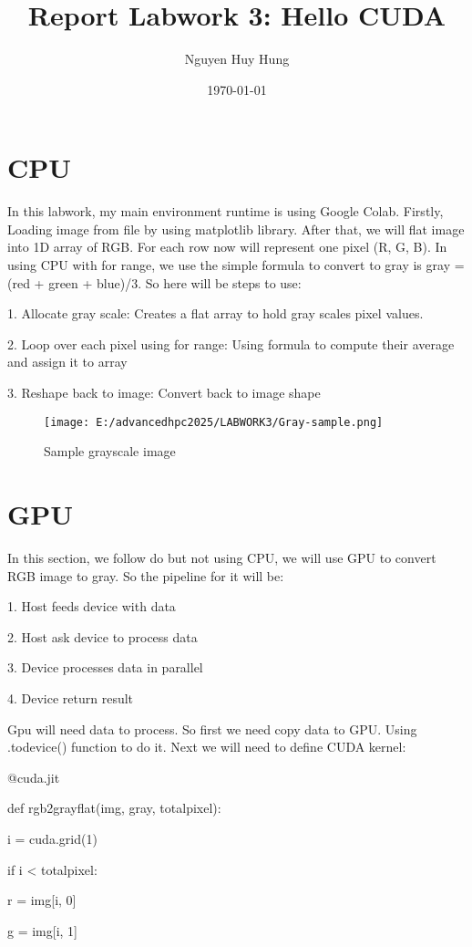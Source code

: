 \documentclass{article} \title{Report Labwork 3: Hello CUDA}
\author{Nguyen Huy Hung}
\date{\today}
\begin{document}
 
\section{CPU} 
In this labwork, my main environment runtime is using Google Colab.
Firstly, Loading image from file by using matplotlib library. After that, we will flat image into 1D array of RGB. For each row now will represent one pixel (R, G, B).
In using CPU with for range, we use the simple formula to convert to gray is gray = (red + green + blue)/3. 
So here will be steps to use: 

1. Allocate gray scale: Creates a flat array to hold gray scales pixel values.

2. Loop over each pixel using for range: Using formula to compute their average and assign it to array

3. Reshape back to image: Convert back to image shape
\begin{figure}[h]
    \centering
    \texttt{[image: E:/advancedhpc2025/LABWORK3/Gray-sample.png]}
    \caption{Sample grayscale image}
    \label{fig:gray-sample}
\end{figure}
\section{GPU}
In this section, we follow do but not using CPU, we will use GPU to convert RGB image to gray.
So the pipeline for it will be: 

1. Host feeds device with data

2. Host ask device to process data

3. Device processes data in parallel

4. Device return result

Gpu will need data to process. So first we need copy data to GPU. Using .todevice() function to do it. 
Next we will need to define CUDA kernel:
 
@cuda.jit

def rgb2grayflat(img, gray, totalpixel):

    i = cuda.grid(1)

    if i < totalpixel:

        r = img[i, 0]

        g = img[i, 1]
\end{document}
